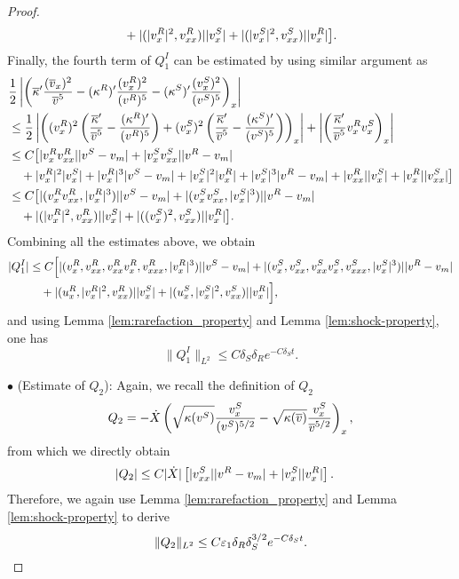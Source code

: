 \documentclass[11pt,reqno]{amsart}
\begin{document}
\begin{proof}
\begin{align*}
        &\quad +|( |v^R_x|^2,v^R_{xx})| |v^S_x|+|( |v^S_x|^2,v^S_{xx})| |v^R_x|\big].
    \end{align*}
    Finally, the fourth term of $Q^I_1$ can be estimated by using similar argument as
    \begin{align*}
        &\frac{1}{2}\left| \left(  \overline{\kappa}' \frac{(\overline{v}_x)^2}{\overline{v}^5} -(\kappa^R)' \frac{(v^R_x)^2}{(v^R)^5}-(\kappa^S)' \frac{(v^S_x)^2}{(v^S)^5}\right)_x \right|\\
        &\le \frac{1}{2} \left| \left( (v^R_{x})^2 \left(\frac{\overline{\kappa}'}{\overline{v}^5}-\frac{(\kappa^R)'}{(v^R)^5} \right)+ (v^S_{x})^2 \left(\frac{\overline{\kappa}'}{\overline{v}^5}-\frac{(\kappa^S)'}{(v^S)^5} \right) \right)_x \right|  + \left|   \left( \frac{\overline{\kappa}'}{\overline{v}^5}v^R_xv^S_x  \right)_x \right| \\
        &\le C \big[  |v^R_{x}v^R_{xx}| | v^S-v_m| + |v^S_{x}v^S_{xx}| | v^R-v_m|  \\ 
        &\quad +  |v^R_{x}|^2 |v^S_x| +  |v^R_{x}|^3  |v^S-v_m| +  |v^S_{x}|^2 |v^R_x| +  |v^S_{x}|^3  |v^R-v_m| + |v^R_{xx}| |v^S_x| + |v^R_{x}| |v^S_{xx}|\big] \\
        &\le C\big[ | (v^R_xv^R_{xx},|v^R_x|^3 ) | |v^S-v_m| + | (v^S_xv^S_{xx},|v^S_x|^3 ) | |v^R-v_m| \\ 
        &\quad +|( |v^R_x|^2,v^R_{xx})| |v^S_x|+|( (v^S_x)^2,v^S_{xx})| |v^R_x|\big].
    \end{align*}
    Combining all the estimates above, we obtain
    \begin{align*}
        |Q_1^I| &\le C\Big[ |(v^R_x,v^R_{xx},v^R_{xx}v^R_x,v^R_{xxx},|v^R_x|^3)| |v^S-v_m| + |(v^S_x,v^S_{xx},v^S_{xx}v^S_x,v^S_{xxx},|v^S_x|^3)| | v^R-v_m|  \\
        &\quad +|( u^R_x,|v^R_x|^2,v^R_{xx})| |v^S_x|+|(u^S_x, |v^S_x|^2,v^S_{xx})| |v^R_x|\Big],
    \end{align*}
and using Lemma \ref{lem:rarefaction_property} and Lemma \ref{lem:shock-property}, one has
\[\|Q_1^I\|_{L^2} \le C \delta_S \delta_R e^{-C \delta_S t}. \]

\noindent $\bullet$ (Estimate of $Q_2$): Again, we recall the definition of $Q_2$
\[ Q_2= - \dot{X} \left(   \sqrt{\kappa(v^S)} \dfrac{ v^S_x}{(v^S)^{5/2}} -  \sqrt{\kappa(\overline{v})}\dfrac{ v^S_x}{\overline{v}^{5/2}}  \right)_x,\]
from which we directly obtain 
\begin{align*}
    |Q_2| &\le C |\dot{X}| \left[ |v^S_{xx}| |v^R-v_m| + |v^S_{x}| |v^R_x|\right].
\end{align*}
Therefore, we again use Lemma \ref{lem:rarefaction_property} and Lemma \ref{lem:shock-property} to derive
\[\|Q_2\|_{L^2} \le C \varepsilon_1 \delta_R \delta_S^{3/2} e^{-C \delta_S t}.\]
\end{proof}
\end{document}
